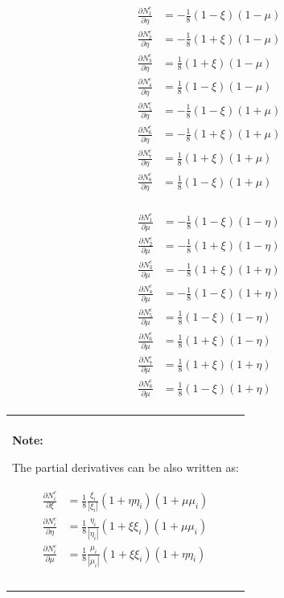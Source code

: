 \documentclass[10pt,b5paper,titlepage]{book}
\newenvironment{bbox}[1][0.96]
{
    \begin{center}
        \begin{tabular}{|p{#1\textwidth}|}
            \hline\\
}
{
            \\\\\hline
        \end{tabular}
    \end{center}
}
\newenvironment{eqarray}
{
    \begin{eqnarray}
        \begin{aligned}
}
{
        \end{aligned}
    \end{eqnarray}
}
\begin{document}
\begin{eqarray}
    \frac{\partial N_1^e}{\partial\eta} &= -\frac{1}{8} \left(1-\xi\right) \left(1-\mu\right)\\
    \frac{\partial N_2^e}{\partial\eta} &= -\frac{1}{8} \left(1+\xi\right) \left(1-\mu\right)\\
    \frac{\partial N_3^e}{\partial\eta} &= \frac{1}{8} \left(1+\xi\right) \left(1-\mu\right)\\
    \frac{\partial N_4^e}{\partial\eta} &= \frac{1}{8} \left(1-\xi\right) \left(1-\mu\right)\\
    \frac{\partial N_5^e}{\partial\eta} &= -\frac{1}{8} \left(1-\xi\right) \left(1+\mu\right)\\
    \frac{\partial N_6^e}{\partial\eta} &= -\frac{1}{8} \left(1+\xi\right) \left(1+\mu\right)\\
    \frac{\partial N_7^e}{\partial\eta} &= \frac{1}{8} \left(1+\xi\right) \left(1+\mu\right)\\
    \frac{\partial N_8^e}{\partial\eta} &= \frac{1}{8} \left(1-\xi\right) \left(1+\mu\right)
\end{eqarray}

\begin{eqarray}
    \frac{\partial N_1^e}{\partial\mu} &= -\frac{1}{8} \left(1-\xi\right) \left(1-\eta\right)\\
    \frac{\partial N_2^e}{\partial\mu} &= -\frac{1}{8} \left(1+\xi\right) \left(1-\eta\right)\\
    \frac{\partial N_3^e}{\partial\mu} &= -\frac{1}{8} \left(1+\xi\right) \left(1+\eta\right)\\
    \frac{\partial N_4^e}{\partial\mu} &= -\frac{1}{8} \left(1-\xi\right) \left(1+\eta\right)\\
    \frac{\partial N_5^e}{\partial\mu} &= \frac{1}{8} \left(1-\xi\right) \left(1-\eta\right)\\
    \frac{\partial N_6^e}{\partial\mu} &= \frac{1}{8} \left(1+\xi\right) \left(1-\eta\right)\\
    \frac{\partial N_7^e}{\partial\mu} &= \frac{1}{8} \left(1+\xi\right) \left(1+\eta\right)\\
    \frac{\partial N_8^e}{\partial\mu} &= \frac{1}{8} \left(1-\xi\right) \left(1+\eta\right)
\end{eqarray}

\begin{bbox}
    \textbf{Note:}

    The partial derivatives can be also written as:

    \begin{eqarray}
        \frac{\partial N_i^e}{\partial \xi} &= \frac{1}{8} \frac{\xi_i}{|\xi_i|}
            \left(1+\eta\eta_i\right) \left(1+\mu\mu_i\right) \\
        \frac{\partial N_i^e}{\partial \eta} &= \frac{1}{8} \frac{\eta_i}{|\eta_i|}
            \left(1+\xi\xi_i\right) \left(1+\mu\mu_i\right) \\
        \frac{\partial N_i^e}{\partial \mu} &= \frac{1}{8} \frac{\mu_i}{|\mu_i|}
            \left(1+\xi\xi_i\right) \left(1+\eta\eta_i\right)
    \end{eqarray}
\end{bbox}
\end{document}
